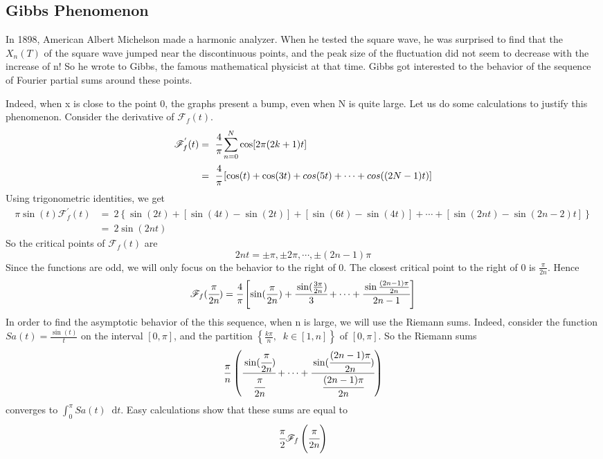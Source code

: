 \documentclass[margin,line]{res}
\newcommand*{\dif}{\mathop{}\!\mathrm{d}}
\begin{document}
\begin{resume}
\subsection{\textbf{Gibbs Phenomenon}}
In 1898, American Albert Michelson made a harmonic analyzer. When he tested the square wave, he was surprised to find that the $X_n(T)$ of the square wave jumped near the discontinuous points, and the peak size of the fluctuation did not seem to decrease with the increase of n! So he wrote to Gibbs, the famous mathematical physicist at that time. Gibbs got interested to the behavior of the sequence of Fourier partial sums around these points. \par
Indeed, when x is close to the point 0, the graphs present a bump, even when N is quite large. Let us do some calculations to justify this phenomenon. Consider the derivative of $\mathscr{F}_f(t)$.
\begin{align}
\mathscr{F}^{'}_f(t) 
	&= \ \cfrac{4}{\pi} \sum\limits_{n=0}^N{\cos [2\pi (2k+1)t]} \nonumber \\
	&= \ \cfrac{4}{\pi} \left[ \cos(t) + \cos(3t) + cos(5t) + \cdots + cos((2N-1)t) \right] \nonumber 
\end{align}
Using trigonometric identities, we get 
\begin{align}
\pi\sin(t) \mathscr{F}^{'}_f(t) 
	&= \ 2\left\{ \sin(2t) + \left[\sin(4t)-\sin(2t)\right] + \left[\sin(6t)-\sin(4t)\right] + \cdots + \left[ \sin(2nt)-\sin(2n-2)t \right] \right\} \nonumber \\
	&= \ 2\sin(2nt) \nonumber
\end{align}
So the critical points of $\mathscr{F}_f(t)$ are 
$$
2nt = \pm\pi , \pm 2\pi,\cdots,\pm (2n-1)\pi
$$
Since the functions are odd, we will only focus on the behavior to the right of 0. The closest critical point to the right of 0 is $\frac{\pi}{2n}$. Hence 
$$
\mathscr{F}_f(\cfrac{\pi}{2n}) = \cfrac{4}{\pi} \left[{
	\sin(\frac{\pi}{2n}) + \cfrac{\sin(\frac{3\pi}{2n})}{3} + \cdots +
	\cfrac{\sin\frac{(2n-1)\pi}{2n}}{2n-1}
}\right]
$$
In order to find the asymptotic behavior of the this sequence, when n is large, we will use the Riemann sums. Indeed, consider the function $Sa(t) = \frac{\sin(t)}{t}$ on the interval $[0,\pi]$, and the partition $\left\{{\frac{k\pi}{n}}, \;\;k \in [1,n]\right\}$ of $[0,\pi]$. So the Riemann sums
$$
\frac{\pi}{n}
\left(
	\cfrac{\sin(\cfrac{\pi}{2n})}{\cfrac{\pi}{2n}} + \cdots +
	\cfrac{\sin(\cfrac{(2n-1)\pi}{2n})}{\cfrac{(2n-1)\pi}{2n}}
\right)
$$
converges to $\int_{0}^{\pi} Sa(t) \dif t$. Easy calculations show that these sums are equal to 
$$
\cfrac{\pi}{2}{\mathscr{F}_f \left( \cfrac{\pi}{2n} \right) }
$$


\end{resume}
\end{document}
